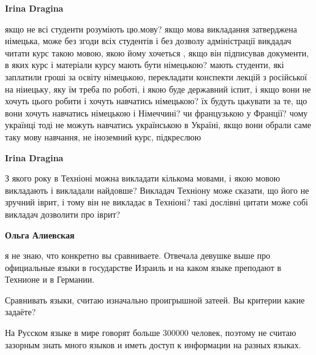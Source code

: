 \begin{itemize}
\begin{itemize}
 
\textbf{Irina Dragina} 

якщо не всі студенти розуміють цю.мову? якщо мова викладання затверджена
німецька, може без згоди всіх студентів і без дозволу адміністрації викдадач
читати курс такою мовою, якою йому хочеться , якщо він підписував документи, в
яких курс і матеріали курсу мають бути німецькою? мають студенти, які заплатили
гроші за освіту німецькою, перекладати конспекти лекцій з російської на
ніиецьку, яку їм треба по роботі, і якою буде державний іспит, і якщо вони не
хочуть цього робити і хочуть навчатись німецькою? їх будуть цькувати за те, що
вони хочуть навчатись німецькою і Німеччині? чи французькою у Франції? чому
українці тоді не можуть навчатись українською в Україні, якщо вони обрали саме
таку мову навчання, не іноземний курс, підкреслюю

 
\textbf{Irina Dragina} 

З якого року в Техніоні можна викладати кількома мовами, і якою мовою
викладають і викладали найдовше? Викладач Техніону може сказати, що його не
зручний іврит, і тому він не викладає в Техніоні? такі дослівні цитати може
собі викладач дозволити про іврит?


 
\textbf{Ольга Алиевская} 

я не знаю, что конкретно вы сравниваете. Отвечала девушке выше про официальные
языки в государстве Израиль и на каком языке преподают в Технионе и в Германии.

Сравнивать языки, считаю изначально проигрышной затеей. Вы критерии какие
задаёте?

На Русском языке в мире говорят больше 300000 человек, поэтому не считаю
зазорным знать много языков и иметь доступ к информации на разных языках.


\end{itemize}
\end{itemize}
